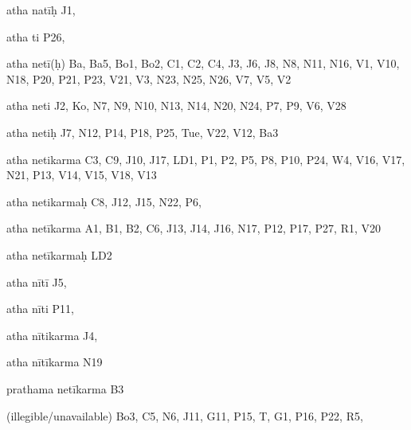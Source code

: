 \begin{marma}[hp02_009]
\begin{marma}[hp02_011]
\begin{marma}[hp02_29d]
\begin{description}
    \end{description}
 \end{marma}

 \begin{marma}[hp02_30]
\item[atha natīḥ] J1,
\item[atha ti] P26, 
\item[atha netī(ḥ)] Ba, Ba5, Bo1, Bo2, C1, C2, C4, J3, J6, J8, N8, N11, N16, V1, V10, N18, P20, P21, P23, V21, V3, N23, N25, N26, V7, V5, V2
\item[atha neti] J2, Ko, N7, N9, N10, N13, N14, N20, N24, P7, P9, V6, V28
\item[atha netiḥ] J7, N12, P14, P18, P25, Tue, V22, V12, Ba3
\item[atha netikarma] C3, C9, J10, J17, LD1, P1, P2, P5, P8, P10, P24, W4, V16, V17, N21, P13, V14, V15, V18, V13
\item[atha netikarmaḥ] C8, J12, J15, N22, P6, 
\item[atha netīkarma] A1, B1, B2, C6, J13, J14, J16, N17, P12, P17, P27, R1, V20
\item[atha netīkarmaḥ] LD2
\item[atha nītī] J5,
\item[atha nīti] P11, 
\item[atha nītikarma] J4,
\item[atha nītīkarma] N19
\item[prathama netīkarma] B3
\item[(illegible/unavailable)] Bo3, C5, N6, J11, G11, P15, T, G1, P16, P22, R5,
  \begin{description}

    \end{description}
 \end{marma}


\end{marma}
\end{marma}
